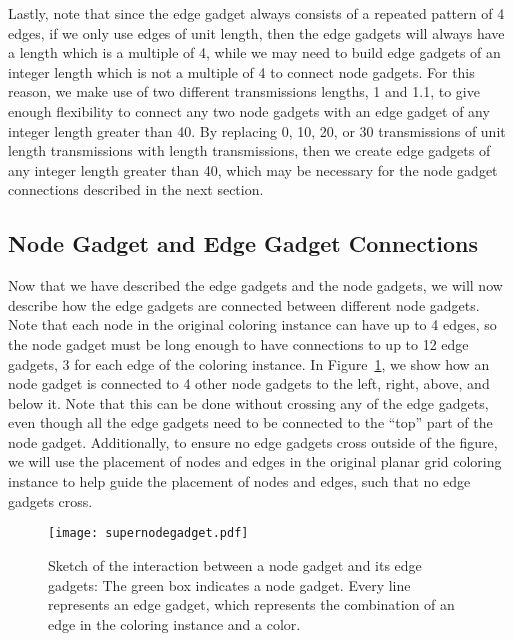 \documentclass{article}
\begin{document}
Lastly, note that since the edge gadget always consists of a repeated pattern of 4 edges, if we only use edges of unit length, then the edge gadgets will always have a length which is a multiple of 4, while we may need to build edge gadgets of an integer length which is not a multiple of 4 to connect node gadgets.  For this reason, we make use of two different transmissions lengths, 1 and 1.1, to give enough flexibility to connect any two node gadgets with an edge gadget of any integer length greater than 40.  By replacing 0, 10, 20, or 30 transmissions of unit length transmissions with length  transmissions, then we create edge gadgets of any integer length greater than 40, which may be necessary for the node gadget connections described in the next section.

\subsection{Node Gadget and Edge Gadget Connections}

Now that we have described the edge gadgets and the node gadgets, we will now describe how the edge gadgets are connected between different node gadgets.  Note that each node in the original coloring instance can have up to 4 edges, so the node gadget must be long enough to have connections to up to 12 edge gadgets, 3 for each edge of the coloring instance.  In Figure~\ref{fig:supernodegadget}, we show how an node gadget is connected to 4 other node gadgets to the left, right, above, and below it.  Note that this can be done without crossing any of the edge gadgets, even though all the edge gadgets need to be connected to the ``top'' part of the node gadget.  Additionally, to ensure no edge gadgets cross outside of the figure, we will use the placement of nodes and edges in the original planar grid coloring instance to help guide the placement of nodes and edges, such that no edge gadgets cross.

\begin{figure}
\begin{center}
\texttt{[image: supernodegadget.pdf]}
\end{center}
\caption[Sketch of a node gadget and  edge gadgets]{Sketch of the interaction between a node gadget and its edge gadgets: The green box indicates a node gadget. Every line represents an edge gadget, which represents the combination of an edge in the coloring instance and a color.}
\label{fig:supernodegadget}
\end{figure}
\end{document}
